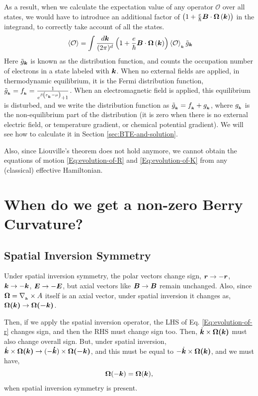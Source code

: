 \documentclass{report}
\renewcommand\vec[1]{\ensuremath\boldsymbol{#1}} %
\begin{document}
As a result, when we calculate the expectation value of any operator $\mathcal{O}$ over all states, we would have to introduce an additional factor of $\left(1 + \frac{e}{\hbar} \vec{B} \cdot \vec{\Omega}\left(\vec{k}\right)\right)$ in the integrand, to correctly take account of all the states.
\begin{equation}~\label{Eq:operator-expval}
\expval{\mathcal{O}} = \int \frac{d\vec{k}}{(2\pi)^d} \left(1 + \frac{e}{\hbar} \vec{B} \cdot  \vec{\Omega}\left(\vec{k}\right)\right) \expval{\mathcal{O}}_{_{\vec{k}}} \tilde{g}_{\vec{k}}
\end{equation}
Here $\tilde{g}_{\vec{k}}$ is known as the distribution function, and counts the occupation number of electrons in a state labeled with $\vec{k}$. When no external fields are applied, in thermodynamic equilibrium, it is the Fermi distribution function, $\tilde{g}_{_{\vec{k}}} = f_{_{\vec{k}}} = \frac{1}{e^{\beta \left(\varepsilon_{_{\vec{k}}} - \mu \right)} + 1}$. When an electromagnetic field is applied, this equilibrium is disturbed, and we write the distribution function as $\tilde{g}_{_{\vec{k}}} = f_{_{\vec{k}}} + g_{_{\vec{k}}}$, where $g_{_{\vec{k}}}$ is the non-equilibrium part of the distribution (it is zero when there is no external electric field, or temperature gradient, or chemical potential gradient). We will see how to calculate it in Section \ref{sec:BTE-and-solution}.

Also, since Liouville's theorem does not hold anymore, we cannot obtain the equations of motion \eqref{Eq:evolution-of-R} and \eqref{Eq:evolution-of-K} from any (classical) effective Hamiltonian. 

\section{When do we get a non-zero Berry Curvature?}
\subsection{Spatial Inversion Symmetry}
Under spatial inversion symmetry, the polar vectors change sign, $\vec{r} \rightarrow -\vec{r}$, $\vec{k} \rightarrow -\vec{k}$, $\vec{E} \rightarrow -\vec{E}$, but axial vectors like $\vec{B} \rightarrow \vec{B}$ remain unchanged. Also, since $\vec{\Omega} = \nabla_{_{\vec{k}}} \times A$ itself is an axial vector, under spatial inversion it changes as, $\vec{\Omega(\vec{k})} \rightarrow \vec{\Omega(\vec{-k})}$.

Then, if we apply the spatial inversion operator, the LHS of Eq. \eqref{Eq:evolution-of-r} changes sign, and then the RHS must change sign too. Then, $\dot{\vec{k}}\times \vec{\Omega(\vec{k})}$ must also change overall sign. But, under spatial inversion,  $\dot{\vec{k}}\times \vec{\Omega(\vec{k})} \rightarrow (-\vec{\dot{k}})\times \vec{\Omega(\vec{-k})}$, and this must be equal to $-\dot{\vec{k}}\times \vec{\Omega(\vec{k})}$, and we must have, 
\begin{equation}\label{Eq:OmegaSpatialInversion}
	\vec{\Omega}(-\vec{k}) = \vec{\Omega}(\vec{k}),
\end{equation}
when spatial inversion symmetry is present.\\\\
\end{document}
